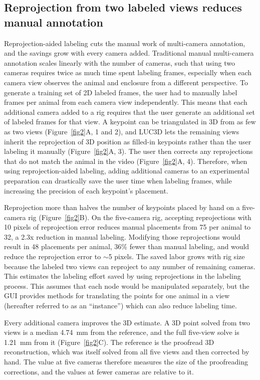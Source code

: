 \documentclass[pdflatex, sn-nature]{sn-jnl}
\theoremstyle{thmstyleone}%
\theoremstyle{thmstyletwo}%
\theoremstyle{thmstylethree}%
\begin{document}
\subsection{Reprojection from two labeled views reduces manual annotation}\label{subsec2-2}

Reprojection-aided labeling cuts the manual work of multi-camera annotation, and the savings grow with every camera added. Traditional manual multi-camera annotation scales linearly with the number of cameras, such that using two cameras requires twice as much time spent labeling frames, especially when each camera view observes the animal and enclosure from a different perspective. To generate a training set of 2D labeled frames, the user had to manually label frames per animal from each camera view independently. This means that each additional camera added to a rig requires that the user generate an additional set of labeled frames for that view. A keypoint can be triangulated in 3D from as few as two views (Figure~\ref{fig2}A, 1 and 2), and LUC3D lets the remaining views inherit the reprojection of 3D position as filled-in keypoints rather than the user labeling it manually (Figure~\ref{fig2}A, 3). The user then corrects any reprojections that do not match the animal in the video (Figure~\ref{fig2}A, 4). Therefore, when using reprojection-aided labeling, adding additional cameras to an experimental preparation can drastically save the user time when labeling frames, while increasing the precision of each keypoint's placement. 

Reprojection more than halves the number of keypoints placed by hand on a five-camera rig (Figure~\ref{fig2}B). On the five-camera rig, accepting reprojections with 10 pixels of reprojection error reduces manual placements from 75 per animal to 32, a 2.3x reduction in manual labeling. Modifying those reprojections would result in 48 placements per animal, 36\% fewer than manual labeling, and would reduce the reprojection error to $\sim$5 pixels. The saved labor grows with rig size because the labeled two views can reproject to any number of remaining cameras. This estimates the labeling effort saved by using reprojections in the labeling process. This assumes that each node would be manipulated separately, but the GUI provides methods for translating the points for one animal in a view (hereafter referred to as an ``instance'') which can also reduce labeling time. 

Every additional camera improves the 3D estimate. A 3D point solved from two views is a median 4.74~mm from the reference, and the full five-view solve is 1.21~mm from it (Figure~\ref{fig2}C). The reference is the proofread 3D reconstruction, which was itself solved from all five views and then corrected by hand. The value at five cameras therefore measures the size of the proofreading corrections, and the values at fewer cameras are relative to it.
\end{document}
